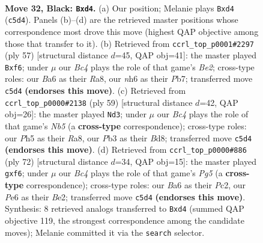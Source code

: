 \documentclass[11pt]{article}
\begin{document}
\clearpage

\begin{figure}[p]\centering
\begin{subfigure}{0.46\textwidth}\centering
\resizebox{\linewidth}{!}{%
\newchessgame
\chessboard[
  setfen={r7/3k4/b1p1p2N/P1b1P2p/3B1P1P/1p6/7K/RN6 b - - 0 32},
  showmover=false,
  pgfstyle=straightmove, color=movearrow, markmove={c5-d4}
]}
\caption{}
\end{subfigure}\hfill
\begin{subfigure}{0.46\textwidth}\centering
\resizebox{\linewidth}{!}{%
\newchessgame
\chessboard[
  setfen={r7/pp2bp1k/2p2B2/4Pp2/2P5/8/PP3P2/2K3R1 b - - 2 29},
  showmover=false,
  pgfstyle=straightmove, color=movearrow, markmove={e7-f6}
]}
\caption{}
\end{subfigure}
\\[4pt]
\begin{subfigure}{0.46\textwidth}\centering
\resizebox{\linewidth}{!}{%
\newchessgame
\chessboard[
  setfen={r2b1k2/6p1/3Np1p1/2B3p1/1n2P2P/1P6/5P1K/2R5 b - - 2 30},
  showmover=false,
  pgfstyle=straightmove, color=movearrow, markmove={b4-d3}
]}
\caption{}
\end{subfigure}\hfill
\begin{subfigure}{0.46\textwidth}\centering
\resizebox{\linewidth}{!}{%
\newchessgame
\chessboard[
  setfen={5k2/1n5p/1B3ppP/5bP1/4r3/2P1p3/2P1B3/1K2R3 w - - 0 37},
  showmover=false,
  pgfstyle=straightmove, color=movearrow, markmove={g5-f6}
]}
\caption{}
\end{subfigure}
\caption{\textbf{Move 32, Black: \texttt{Bxd4}.} (a) Our position; Melanie plays \texttt{Bxd4} (\texttt{c5d4}). Panels (b)--(d) are the retrieved master positions whose correspondence most drove this move (highest QAP objective among those that transfer to it). (b) Retrieved from \texttt{ccrl\_top\_p0001\#2297} (ply 57) [structural distance $d$=45, QAP obj=41]: the master played \texttt{Bxf6}; under $\mu$ our \emph{Bc4} plays the role of that game's \emph{Be2}; cross-type roles: our \emph{B}a6 as their \emph{R}a8, our \emph{n}h6 as their \emph{P}b7; transferred move \texttt{c5d4} \textbf{(endorses this move)}. (c) Retrieved from \texttt{ccrl\_top\_p0000\#2138} (ply 59) [structural distance $d$=42, QAP obj=26]: the master played \texttt{Nd3}; under $\mu$ our \emph{Bc4} plays the role of that game's \emph{Nb5} (a \textbf{cross-type} correspondence); cross-type roles: our \emph{P}h5 as their \emph{R}a8, our \emph{P}b3 as their \emph{B}d8; transferred move \texttt{c5d4} \textbf{(endorses this move)}. (d) Retrieved from \texttt{ccrl\_top\_p0000\#886} (ply 72) [structural distance $d$=34, QAP obj=15]: the master played \texttt{gxf6}; under $\mu$ our \emph{Bc4} plays the role of that game's \emph{Pg5} (a \textbf{cross-type} correspondence); cross-type roles: our \emph{B}a6 as their \emph{P}c2, our \emph{P}e6 as their \emph{B}e2; transferred move \texttt{c5d4} \textbf{(endorses this move)}. Synthesis: 8 retrieved analogs transferred to \texttt{Bxd4} (summed QAP objective 119, the strongest correspondence among the candidate moves); Melanie committed it via the \texttt{search} selector.}
\label{fig:thought-m63}
\end{figure}
\end{document}

